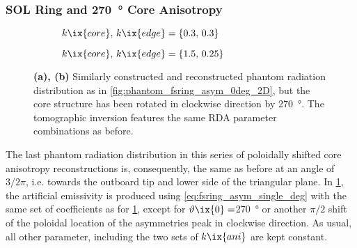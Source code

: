             \subsubsection*{SOL Ring and \SI{270}{\degree} Core Anisotropy}%
%
                \begin{figure}[t]%
                    \centering%
                    \begin{subfigure}{\textwidth}%
                        \centering%
                        \caption{$k\ix{core},\,k\ix{edge}=\left\{0.3,\,0.3\right\}$}%
                    \end{subfigure}%
                    \newline%
                    \begin{subfigure}{\textwidth}%
                        \centering%
                        \caption{$k\ix{core},\,k\ix{edge}=\left\{1.5,\,0.25\right\}$}%
                    \end{subfigure}%
                    \caption{\textbf{(a), (b)} Similarly constructed and reconstructed phantom radiation distribution as in \cref{fig:phantom_fsring_asym_0deg_2D}, but the core structure has been rotated in clockwise direction by \SI{270}{\degree}. The tomographic inversion features the same RDA parameter combinations as before.}\label{fig:phantom_fsring_asym_270deg_2D}%
                \end{figure}%
%
                The last phantom radiation distribution in this series of poloidally shifted core anisotropy reconstructions is, consequently, the same as before at an angle of $3/2\pi$, i.e. towards the outboard tip and lower side of the triangular plane. In \cref{fig:phantom_fsring_asym_270deg_2D}, the artificial emissivity is produced using \cref{eq:fsring_asym_single_deg} with the same set of coefficients as for \cref{fig:phantom_fsring_asym_270deg_2D}, except for $\vartheta\ix{0}=$\SI{270}{\degree} or another $\pi/2$ shift of the poloidal location of the asymmetries peak in clockwise direction. As usual, all other parameter, including the two sets of $k\ix{ani}$ are kept constant.\\%
